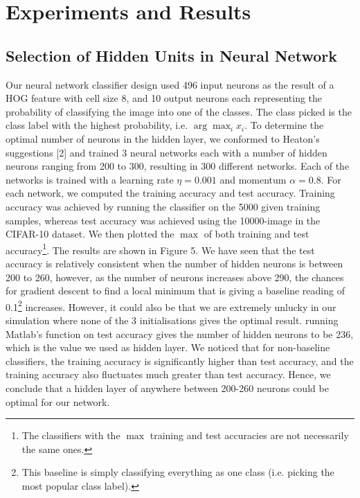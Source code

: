 \documentclass{article} %
\begin{document}
\section{Experiments and Results}

\subsection{Selection of Hidden Units in Neural Network}

Our neural network classifier design used 496 input neurons as the result of a HOG feature with cell size 8, and 10 output neurons each representing the probability of classifying the image into one of the classes. The class picked is the class label with the highest probability, i.e. $\arg\max_i {x_i}$. To determine the optimal number of neurons in the hidden layer, we conformed to Heaton's suggestions [2] and trained 3 neural networks each with a number of hidden neurons ranging from 200 to 300, resulting in 300 different networks. Each of the networks is trained with a learning rate $\eta=0.001$ and momentum $\alpha=0.8$. For each network, we computed the training accuracy and test accuracy. Training accuracy was achieved by running the classifier on the 5000 given training samples, whereas test accuracy was achieved using the 10000-image  in the CIFAR-10 dataset. We then plotted the $\max$ of both training and test accuracy\footnote{The classifiers with the $\max$ training and test accuracies are not necessarily the same ones.}. The results are shown in Figure 5. We have seen that the test accuracy is relatively consistent when the number of hidden neurons is between 200 to 260, however, as the number of neurons increases above 290, the chances for gradient descent to find a local minimum that is giving a baseline reading of 0.1\footnote{This baseline is simply classifying everything as one class (i.e. picking the most popular class label).} increases. However, it could also be that we are extremely unlucky in our simulation where none of the 3 initialisations gives the optimal result. running Matlab's  function on test accuracy gives the number of hidden neurons to be 236, which is the value we used as hidden layer. We noticed that for non-baseline classifiers, the training accuracy is significantly higher than test accuracy, and the training accuracy also fluctuates much greater than test accuracy. Hence, we conclude that a hidden layer of anywhere between 200-260 neurons could be optimal for our network.
\end{document}
